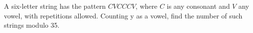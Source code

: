 A six-letter string has the pattern $ CVCCCV $, where $ C $ is any consonant and $ V $ any vowel, with repetitions allowed. Counting y as a vowel, find the number of such strings modulo 35.
